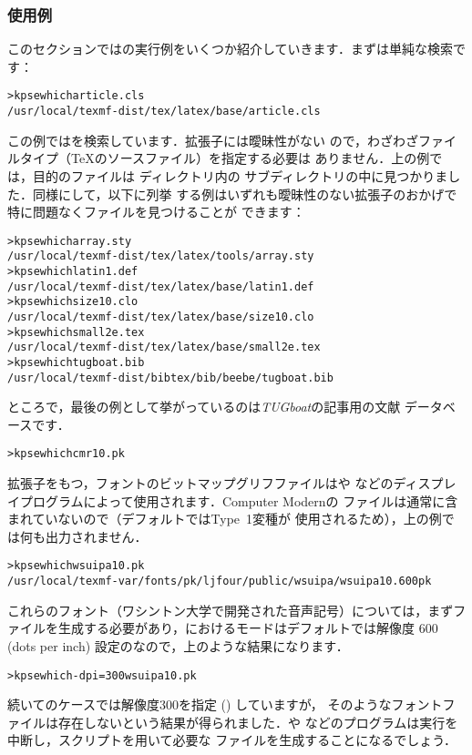 \documentclass[uplatex,dvipdfmx,tombow]{jsarticle}
\begin{document}
\subsubsection{使用例}
\label{sec:examples-of-use}

このセクションでは\KPS の実行例をいくつか紹介していきます．まずは単純な検索です：
%
\begin{alltt}
> kpsewhich article.cls
   /usr/local/texmf-dist/tex/latex/base/article.cls
\end{alltt}
%
この例ではを検索しています．拡張子には曖昧性がない
ので，わざわざファイルタイプ（\TeX のソースファイル）を指定する必要は
ありません．上の例では，目的のファイルは \TL ディレクトリ内の
サブディレクトリの中に見つかりました．同様にして，以下に列挙
する例はいずれも曖昧性のない拡張子のおかげで特に問題なくファイルを見つけることが
できます：
%
\begin{alltt}
> kpsewhich array.sty
   /usr/local/texmf-dist/tex/latex/tools/array.sty
> kpsewhich latin1.def
   /usr/local/texmf-dist/tex/latex/base/latin1.def
> kpsewhich size10.clo
   /usr/local/texmf-dist/tex/latex/base/size10.clo
> kpsewhich small2e.tex
   /usr/local/texmf-dist/tex/latex/base/small2e.tex
> kpsewhich tugboat.bib
   /usr/local/texmf-dist/bibtex/bib/beebe/tugboat.bib
\end{alltt}
%
ところで，最後の例として挙がっているのは\textsl{TUGboat}の記事用の\BibTeX 文献
データベースです．

\begin{alltt}
> kpsewhich cmr10.pk
\end{alltt}
%
拡張子をもつ，フォントのビットマップグリフファイルはや
などのディスプレイプログラムによって使用されます．Computer Modernの
ファイルは通常\TL に含まれていないので（デフォルトではType~1変種が
使用されるため），上の例では何も出力されません．

\begin{alltt}
> kpsewhich wsuipa10.pk
   /usr/local/texmf-var/fonts/pk/ljfour/public/wsuipa/wsuipa10.600pk
\end{alltt}
%
これらのフォント（ワシントン大学で開発された音声記号）については，まずファイルを生成する必要があり，\TL における\MF モードはデフォルトでは解像度
600{\dpi} (dots per inch) 設定のなので，上のような結果になります．
%
\begin{alltt}
> kpsewhich -dpi=300 wsuipa10.pk
\end{alltt}
%
続いてのケースでは解像度300\dpi を指定 () していますが，
そのようなフォントファイルは存在しないという結果が得られました．や
などのプログラムは実行を中断し，スクリプトを用いて必要な
ファイルを生成することになるでしょう．
\end{document}
